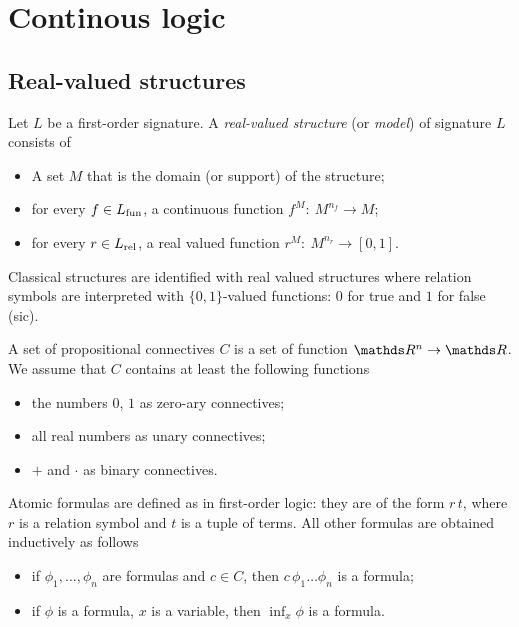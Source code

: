 \documentclass[creche.tex]{subfiles}
\begin{document}
\chapter{Continous logic}
\label{measures}

\def\medrel#1{\parbox[t]{5ex}{$\displaystyle\hfil #1$}}
\def\ceq#1#2#3{\parbox[t]{18ex}{$\displaystyle #1$}\medrel{#2}{$\displaystyle #3$}}


\def\Msr{{\rm Msr\kern.0ex}}


\section{Real-valued structures}

Let $L$ be a first-order signature. A \emph{real-valued structure\/} (or \emph{model\/}) of signature $L$ consists of\nobreak
\begin{itemize}
\item[1] A set $M$ that is the domain (or support) of the structure;
\item[2.] for every  $f\in L_{\rm fun}$, a continuous function $f^M:\ M^{n_f}\to M$;
\item[3.] for every $r\in L_{\rm rel}$, a real valued function $r^M:\ M^{n_r}\to [0,1]$.
\end{itemize}

Classical structures are identified with real valued structures where relation symbols are interpreted with $\{0,1\}$-valued functions: $0$ for true and $1$ for false (sic).

A set of propositional connectives $C$ is a set of function $\RR^n\to\RR$. We assume that $C$ contains at least the following functions

\begin{itemize}
\item[0.] the numbers $0$, $1$ as zero-ary connectives;
\item[1.] all real numbers as unary connectives;
\item[2.] $+$ and $\cdot$ as binary connectives.
\end{itemize}

Atomic formulas are defined as in first-order logic: they are of the form $r\,t$, where $r$ is a relation symbol and $t$ is a tuple of terms. All other formulas are obtained inductively as follows

\begin{itemize}
\item[1.] if $\phi_1,\dots,\phi_n$ are formulas and $c\in C$, then $c\,\phi_1\dots\phi_n$ is a formula;
\item[2.] if $\phi$ is a formula, $x$ is a variable, then $\inf_x\phi$ is a formula.
\end{itemize}
\end{document}
